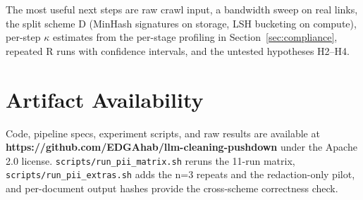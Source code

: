 \documentclass[11pt]{article}
\begin{document}
The most useful next steps are raw crawl input, a bandwidth sweep on real links, the split scheme D (MinHash signatures on storage, LSH bucketing on compute), per-step $\kappa$ estimates from the per-stage profiling in Section~\ref{sec:compliance}, repeated R runs with confidence intervals, and the untested hypotheses H2--H4.

\section*{Artifact Availability}

Code, pipeline specs, experiment scripts, and raw results are available at \textbf{https://github.com/EDGAhab/llm-cleaning-pushdown} under the Apache 2.0 license. \texttt{scripts/run\_pii\_matrix.sh} reruns the 11-run matrix, \texttt{scripts/run\_pii\_extras.sh} adds the n=3 repeats and the redaction-only pilot, and per-document output hashes provide the cross-scheme correctness check.
\end{document}
